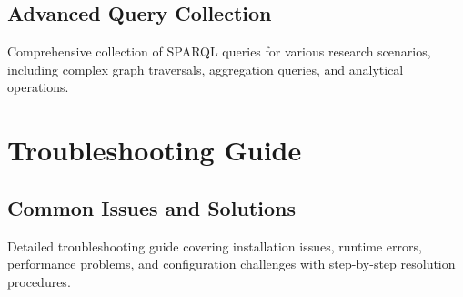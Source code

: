 \documentclass[12pt,a4paper]{article}
\begin{document}
\subsection{Advanced Query Collection}

Comprehensive collection of SPARQL queries for various research scenarios, including complex graph traversals, aggregation queries, and analytical operations.

\section{Troubleshooting Guide}

\subsection{Common Issues and Solutions}

Detailed troubleshooting guide covering installation issues, runtime errors, performance problems, and configuration challenges with step-by-step resolution procedures.
\end{document}
